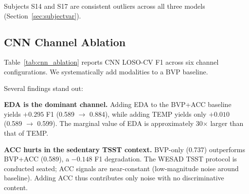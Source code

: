 \documentclass[10pt,twocolumn]{article}
\begin{document}
Subjects S14 and S17 are consistent outliers across all three models
(Section~\ref{sec:subjectvar}).

\subsection{CNN Channel Ablation}
\label{sec:cnn_ablation}

Table~\ref{tab:cnn_ablation} reports CNN LOSO-CV F1 across six channel
configurations. We systematically add modalities to a BVP baseline.

\begin{table}[t]
  \centering
  \caption{CNN channel ablation. Mean F1 $\pm$ std across 15 LOSO folds.
           The ablation is an independent set of LOSO trainings; its full
           six-channel entry (0.878) differs from the main-comparison CNN
           in Table~\ref{tab:main} (0.897) by run-to-run stochastic variance,
           itself indicative of the training noise at $n=15$.}
  \label{tab:cnn_ablation}
  \small
  \setlength{\tabcolsep}{4pt}
\end{table}

Several findings stand out:

\textbf{EDA is the dominant channel.} Adding EDA to the BVP+ACC baseline
yields $+0.295$ F1 (0.589 $\to$ 0.884), while adding TEMP yields only $+0.010$
(0.589 $\to$ 0.599). The marginal value of EDA is approximately 30$\times$
larger than that of TEMP.

\textbf{ACC hurts in the sedentary TSST context.} BVP-only (0.737) outperforms
BVP+ACC (0.589), a $-0.148$ F1 degradation. The WESAD TSST protocol is
conducted seated; ACC signals are near-constant (low-magnitude noise around
baseline). Adding ACC thus contributes only noise with no discriminative content.
\end{document}
